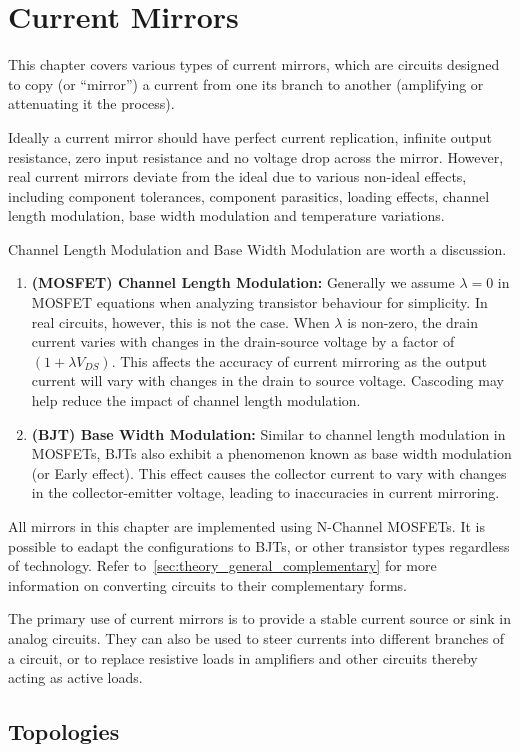 \chapter{Current Mirrors}\label{ch:Current_Mirrors}

This chapter covers various types of current mirrors,
which are circuits designed to copy (or ``mirror'') a current
from one its branch to another (amplifying or attenuating
it the process).

Ideally a current mirror should have perfect current
replication, infinite output resistance, zero input
resistance and no voltage drop across the mirror. However,
real current mirrors deviate from the ideal due to various
non-ideal effects, including component tolerances, component
parasitics, loading effects, channel length modulation,
base width modulation and temperature variations.

Channel Length Modulation and Base Width Modulation are
worth a discussion.
\begin{enumerate}
  \item \textbf{(MOSFET) Channel Length Modulation:} Generally
    we assume $\lambda = 0$ in MOSFET equations when analyzing
    transistor behaviour for simplicity. In real circuits,
    however, this is not the case. When $\lambda$ is non-zero,
    the drain current varies with changes in the drain-source
    voltage by a factor of $(1 + \lambda V_{DS})$. This affects
    the accuracy of current mirroring as the output current
    will vary with changes in the drain to source voltage.
    Cascoding may help reduce the impact of channel length modulation.
  \item \textbf{(BJT) Base Width Modulation:} Similar to channel length
    modulation in MOSFETs, BJTs also exhibit a phenomenon
    known as base width modulation (or Early effect). This
    effect causes the collector current to vary with changes
    in the collector-emitter voltage, leading to inaccuracies
    in current mirroring.
\end{enumerate}

All mirrors in this chapter are implemented using N-Channel
MOSFETs. It is possible to eadapt the configurations to
BJTs, or other transistor types regardless of technology.
Refer to~\ref{sec:theory_general_complementary} for more
information on converting circuits to their complementary
forms.

The primary use of current mirrors is to provide a stable
current source or sink in analog circuits. They can also
be used to steer currents into different branches of a
circuit, or to replace resistive loads in amplifiers and
other circuits thereby acting as active loads.

\section{Topologies}




